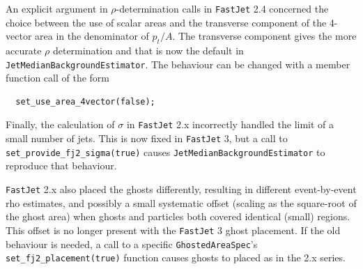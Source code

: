 \documentclass[12pt,a4]{article}
\newcommand{\fastjet}{\texttt{FastJet}\xspace}
\newcommand{\ttt}[1]{{\small\texttt{#1}}}
\begin{document}
An explicit argument in $\rho$-determination calls in \fastjet 2.4
concerned the choice between the use of scalar areas and the
transverse component of the 4-vector area in the denominator of
$p_t/A$.
%
The transverse component gives the more accurate $\rho$ determination
and that is now the default in \ttt{JetMedianBackgroundEstimator}. 
%
The behaviour can be changed with a member function call of the form 
\begin{lstlisting}
  set_use_area_4vector(false);
\end{lstlisting}
%
Finally, the calculation of $\sigma$ in \fastjet 2.x incorrectly
handled the limit of a small number of jets. This is now fixed in \fastjet 3, but 
a call to
\ttt{set\_provide\_fj2\_sigma(true)} causes \ttt{JetMedianBackgroundEstimator}
to reproduce that behaviour.

\fastjet 2.x also placed the ghosts differently, resulting in different
event-by-event rho estimates, and possibly a small systematic offset
(scaling as the square-root of the ghost area) when ghosts and
particles both covered identical (small) regions.
%
This offset is no longer present with the \fastjet 3 ghost placement.
%
If the old behaviour is needed, a call to a specific
\ttt{GhostedAreaSpec}'s \ttt{set\_fj2\_placement(true)} function
causes ghosts to placed as in the 2.x series.



\newpage
\end{document}
